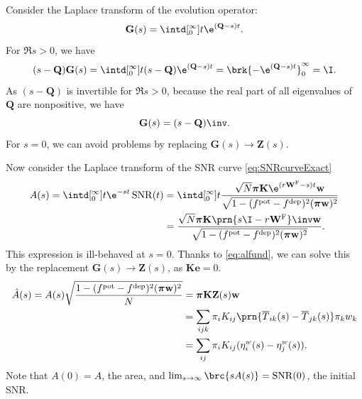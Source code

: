 \documentclass[12pt]{article}
\newcommand{\onev}{\mathbf{e}}
\newcommand{\MMm}{Q}
\newcommand{\MM}{\mathbf{\MMm}}
\newcommand{\eqm}{\pi}
\newcommand{\eq}{\boldsymbol{\eqm}}
\newcommand{\fptm}{T}
\newcommand{\fptbm}{\overline{\fptm}}
\newcommand{\fundm}{Z}
\newcommand{\fund}{\mathbf{\fundm}}
\newcommand{\etwm}{\eta^w}
\newcommand{\wm}{w}
\newcommand{\w}{\mathbf{\wm}}
\newcommand{\Wm}{W}
\newcommand{\W}{\mathbf{\Wm}}
\newcommand{\encm}{K}
\newcommand{\enc}{\mathbf{\encm}}
\newcommand{\frg}{\W^{\mathrm{F}}}
\newcommand{\pot}{^{\text{pot}}}
\newcommand{\dep}{^{\text{dep}}}
\DeclareMathOperator{\SNR}{SNR}
\begin{document}
Consider the Laplace transform of the evolution operator:
%
\begin{equation}\label{eq:levol}
  \mathbf{G}(s) = \intd[_0^{\infty}]{t} \e^{(\MM-s) t}.
\end{equation}
%
For $\Re s>0$, we have
%
\begin{equation}\label{eq:levolcalc}
  (s-\MM)\mathbf{G}(s) = \intd[_0^{\infty}]{t} (s-\MM)\e^{(\MM-s) t} = \brk{-\e^{(\MM-s) t}}_0^{\infty} = \I.
\end{equation}
%
As $(s-\MM)$ is invertible for $\Re s>0$, because the real part of all eigenvalues of $\MM$ are nonpositive, we have
%
\begin{equation}\label{eq:levolres}
  \mathbf{G}(s) = (s-\MM)\inv.
\end{equation}
%
For $s=0$, we can avoid problems by replacing $\mathbf{G}(s) \to \fund(s)$.

Now consider the Laplace transform of the SNR curve \eqref{eq:SNRcurveExact}
%
\begin{equation}\label{eq:lsnr}
\begin{aligned}
  A(s) = \intd[_0^{\infty}]{t} \e^{-st}\SNR(t) 
   &= \intd[_0^{\infty}]{t} \frac{ \sqrt{N} \eq \enc \e^{(r\frg-s)t} \w }
                                { \sqrt{1-(f\pot-f\dep)^2(\eq\w)^2} } \\
   &= \frac{\sqrt{N} \eq \enc \prn{s \I - r\frg}\inv \w }{\sqrt{1-(f\pot-f\dep)^2(\eq\w)^2}}.
\end{aligned}
\end{equation}
%
This expression is ill-behaved at $s=0$.
Thanks to \eqref{eq:alfund}, we can solve this by the replacement $\mathbf{G}(s) \to \fund(s)$, as $\enc\onev=0$.
%
\begin{equation}\label{eq:larea}
\begin{aligned}
  \hat{A}(s) = A(s) \sqrt{\frac{{{1-(f\pot-f\dep)^2(\eq\w)^2}}}{N}}  &=  \eq \enc \fund(s) \w \\
    &= \sum_{ijk} \eqm_i \encm_{ij} \prn{\fptbm_{ik}(s)-\fptbm_{jk}(s)} \eqm_k \wm_k \\
    &= \sum_{ij}  \eqm_i \encm_{ij} (\etwm_{i}(s) - \etwm_{j}(s)).
\end{aligned}
\end{equation}
%
Note that $A(0)=A$, the area, and $\lim_{s\to\infty} \brc{sA(s)} = \SNR(0)$, the initial SNR.
\end{document}

